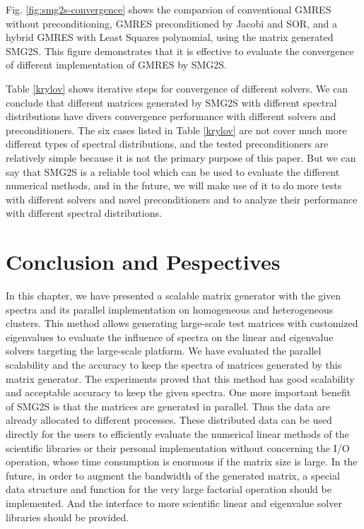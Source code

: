 Fig. \ref{fig:smg2s-convergence} shows the comparsion of conventional GMRES without preconditioning, GMRES preconditioned by Jacobi and SOR, and a hybrid GMRES with Least Squares polynomial, using the matrix generated SMG2S. This figure demonstrates that it is effective to evaluate the convergence of different implementation of GMRES by SMG2S.

Table \ref{krylov} shows iterative steps for convergence of different solvers. We can conclude that different matrices generated by SMG2S with different spectral distributions have divers convergence performance with different solvers and preconditioners. The six cases listed in Table \ref{krylov} are not cover much more different types of spectral distributions, and the tested preconditioners are relatively simple because it is not the primary purpose of this paper. But we can say that SMG2S is a reliable tool which can be used to evaluate the different numerical methods, and in the future, we will make use of it to do more tests with different solvers and novel preconditioners and to analyze their performance with different spectral distributions.

\section{Conclusion and Pespectives}\label{conclusion}

In this chapter, we have presented a scalable matrix generator with the given spectra and its parallel implementation on homogeneous and heterogeneous clusters. This method allows generating large-scale test matrices with customized eigenvalues to evaluate the influence of spectra on the linear and eigenvalue solvers targeting the large-scale platform. We have evaluated the parallel scalability and the accuracy to keep the spectra of matrices generated by this matrix generator. The experiments proved that this method has good scalability and acceptable accuracy to keep the given spectra. One more important benefit of SMG2S is that the matrices are generated in parallel. Thus the data are already allocated to different processes. These distributed data can be used directly for the users to efficiently evaluate the numerical linear methods of the scientific libraries or their personal implementation without concerning the I/O operation, whose time consumption is enormous if the matrix size is large. In the future, in order to augment the bandwidth of the generated matrix, a special data structure and function for the very large factorial operation should be implemented. And the interface to more scientific linear and eigenvalue solver libraries should be provided.


\clearemptydoublepage
